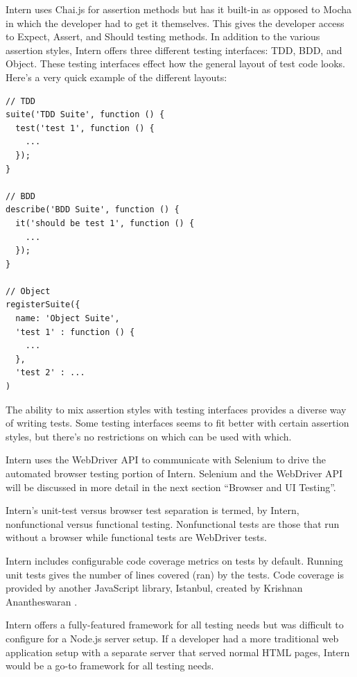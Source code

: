 \documentclass[12pt]{ucthesis}
\begin{document}
Intern uses Chai.js for assertion methods but has it built-in as opposed to Mocha in which the developer had to get it themselves. This gives the developer access to Expect, Assert, and Should testing methods. In addition to the various assertion styles, Intern offers three different testing interfaces: TDD, BDD, and Object. These testing interfaces effect how the general layout of test code looks. Here's a very quick example of the different layouts:
\begin{lstlisting}
// TDD
suite('TDD Suite', function () {
  test('test 1', function () {
    ...
  });
}

// BDD
describe('BDD Suite', function () {
  it('should be test 1', function () {
    ...
  });
}

// Object
registerSuite({
  name: 'Object Suite', 
  'test 1' : function () {
    ...
  },
  'test 2' : ...
)
\end{lstlisting}

The ability to mix assertion styles with testing interfaces provides a diverse way of writing tests. Some testing interfaces seems to fit better with certain assertion styles, but there's no restrictions on which can be used with which.

Intern uses the WebDriver API to communicate with Selenium to drive the automated browser testing portion of Intern. Selenium and the WebDriver API will be discussed in more detail in the next section ``Browser and UI Testing''.

Intern's unit-test versus browser test separation is termed, by Intern, nonfunctional versus functional testing. Nonfunctional tests are those that run without a browser while functional tests are WebDriver tests.

Intern includes configurable code coverage metrics on tests by default. Running unit tests gives the number of lines covered (ran) by the tests. Code coverage is provided by another JavaScript library, Istanbul, created by Krishnan Anantheswaran \cite{Istanbul}.

Intern offers a fully-featured framework for all testing needs but was difficult to configure for a Node.js server setup. If a developer had a more traditional web application setup with a separate server that served normal HTML pages, Intern would be a go-to framework for all testing needs.
\end{document}
